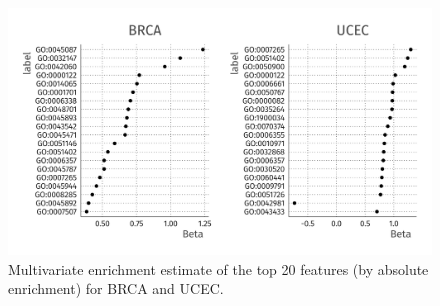 \begin{figure}
    \centering
    \includegraphics[width=.9\linewidth]{img/fgem_enrichment_plot.png}
    \caption{Multivariate enrichment estimate of the top 20 features (by absolute enrichment) for BRCA and UCEC.} 
\end{figure}



